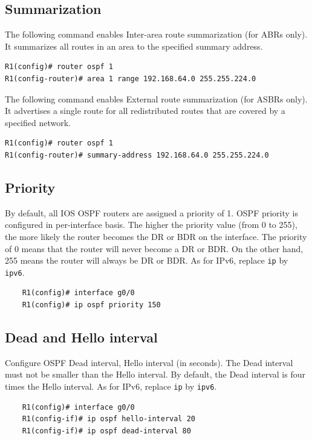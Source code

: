 \subsection{Summarization}

The following command enables Inter-area route summarization (for ABRs only). It summarizes all routes in an area to the specified summary address.

\begin{verbatim}
R1(config)# router ospf 1
R1(config-router)# area 1 range 192.168.64.0 255.255.224.0
\end{verbatim}

The following command enables External route summarization (for ASBRs only). It advertises a single route for all redistributed routes that are covered by a specified network.

\begin{verbatim}
R1(config)# router ospf 1
R1(config-router)# summary-address 192.168.64.0 255.255.224.0
\end{verbatim}

\subsection{Priority}

By default, all IOS OSPF routers are assigned a priority of 1. OSPF priority is configured in per-interface basis. The higher the priority value (from 0 to 255), the more likely the router becomes the DR or BDR on the interface.	The priority of 0 means that the router will never  become a DR or BDR. On the other hand, 255 means the router will always be DR or BDR. As for IPv6, replace \verb|ip| by \verb|ipv6|.
	\begin{verbatim}
	R1(config)# interface g0/0 
	R1(config)# ip ospf priority 150
	\end{verbatim}
	
\subsection{Dead and Hello interval}

Configure OSPF Dead interval, Hello interval (in seconds). \note The Dead interval must not be smaller than the Hello interval. By default, the Dead interval is four times the Hello interval. As for IPv6, replace \verb|ip| by \verb|ipv6|.
	\begin{verbatim}
	R1(config)# interface g0/0
	R1(config-if)# ip ospf hello-interval 20 
	R1(config-if)# ip ospf dead-interval 80
	\end{verbatim}
	
